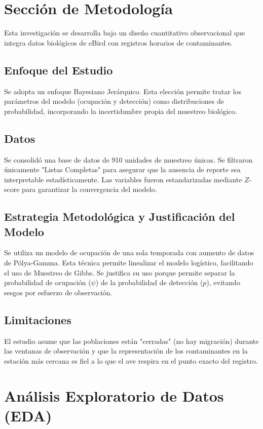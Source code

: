 \documentclass[12pt]{article}
\begin{document}
\section{Sección de Metodología}

Esta investigación se desarrolla bajo un diseño cuantitativo observacional que integra datos biológicos de eBird con registros horarios de contaminantes.

\subsection*{Enfoque del Estudio}
Se adopta un enfoque Bayesiano Jerárquico. Esta elección permite tratar los parámetros del modelo (ocupación y detección) como distribuciones de probabilidad, incorporando la incertidumbre propia del muestreo biológico.

\subsection*{Datos}
Se consolidó una base de datos de 910 unidades de muestreo únicas. Se filtraron únicamente "Listas Completas" para asegurar que la ausencia de reporte sea interpretable estadísticamente. Las variables fueron estandarizadas mediante $Z$-score para garantizar la convergencia del modelo.

\subsection*{Estrategia Metodológica y Justificación del Modelo}
Se utiliza un modelo de ocupación de una sola temporada con aumento de datos de Pólya-Gamma. Esta técnica permite linealizar el modelo logístico, facilitando el uso de Muestreo de Gibbs. Se justifica su uso porque permite separar la probabilidad de ocupación ($\psi$) de la probabilidad de detección ($p$), evitando sesgos por esfuerzo de observación.

\subsection*{Limitaciones}
El estudio asume que las poblaciones están "cerradas" (no hay migración) durante las ventanas de observación y que la representación de los contaminantes en la estación más cercana es fiel a lo que el ave respira en el punto exacto del registro.

\section{Análisis Exploratorio de Datos (EDA)}
\end{document}
